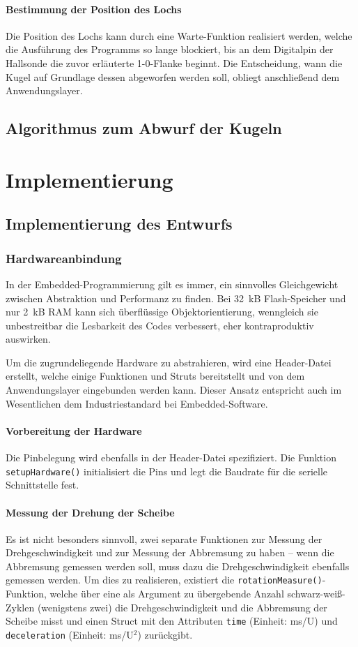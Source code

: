 \documentclass{kis}
\begin{document}
\paragraph{Bestimmung der Position des Lochs}
Die Position des Lochs kann durch eine Warte-Funktion realisiert werden, welche die Ausführung des Programms so lange blockiert, bis an dem Digitalpin der Hallsonde die zuvor erläuterte 1-0-Flanke beginnt. Die Entscheidung, wann die Kugel auf Grundlage dessen abgeworfen werden soll, obliegt anschließend dem Anwendungslayer. 

\subsection{Algorithmus zum Abwurf der Kugeln}

\section{Implementierung}

\subsection{Implementierung des Entwurfs}
\subsubsection{Hardwareanbindung}
In der Embedded-Programmierung gilt es immer, ein sinnvolles Gleichgewicht zwischen Abstraktion und Performanz zu finden. Bei 32~kB Flash-Speicher und nur 2~kB RAM kann sich überflüssige Objektorientierung, wenngleich sie unbestreitbar die Lesbarkeit des Codes verbessert, eher kontraproduktiv auswirken.

Um die zugrundeliegende Hardware zu abstrahieren, wird eine Header-Datei erstellt, welche einige Funktionen und Struts bereitstellt und von dem Anwendungslayer eingebunden werden kann. Dieser Ansatz entspricht auch im Wesentlichen dem Industriestandard bei Embedded-Software.

\paragraph{Vorbereitung der Hardware}
Die Pinbelegung wird ebenfalls in der Header-Datei spezifiziert. Die Funktion \texttt{setupHardware()} initialisiert die Pins und legt die Baudrate für die serielle Schnittstelle fest.

\paragraph{Messung der Drehung der Scheibe}
Es ist nicht besonders sinnvoll, zwei separate Funktionen zur Messung der Drehgeschwindigkeit und zur Messung der Abbremsung zu haben -- wenn die Abbremsung gemessen werden soll, muss dazu die Drehgeschwindigkeit ebenfalls gemessen werden. Um dies zu realisieren, existiert die \texttt{rotationMeasure()}-Funktion, welche über eine als Argument zu übergebende Anzahl schwarz-weiß-Zyklen (wenigstens zwei) die Drehgeschwindigkeit und die Abbremsung der Scheibe misst und einen Struct mit den Attributen \texttt{time} (Einheit: ms/U) und \texttt{deceleration} (Einheit: ms/U$^2$) zurückgibt.
\end{document}
